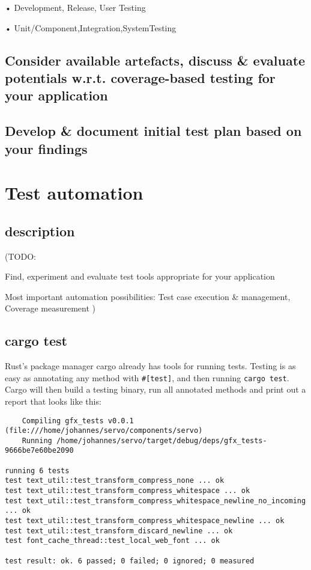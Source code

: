 \documentclass{scrartcl}
\newcommand{\todo}[1] {{\color{red}(TODO: #1)}}
\begin{document}
• Development, Release, User Testing

• Unit/Component,Integration,SystemTesting

\subsection{Consider available artefacts, discuss \& evaluate potentials w.r.t. coverage-based testing for your application}

\subsection{Develop \& document initial test plan based on your findings}





\newpage



\section{Test automation}

\subsection{description}
\todo {

Find, experiment and evaluate test tools appropriate for your application

Most important automation possibilities: Test case execution \& management, Coverage measurement
}

\subsection{cargo test}

Rust's package manager cargo already has tools for running tests. Testing is as easy as annotating any method with \texttt{\#[test]}, and then running \texttt{cargo test}. Cargo will then build a testing binary, run all annotated methods and print out a report that looks like this:


\begin{verbatim}
    Compiling gfx_tests v0.0.1 (file:///home/johannes/servo/components/servo)
    Running /home/johannes/servo/target/debug/deps/gfx_tests-9666be7e60be2090

running 6 tests
test text_util::test_transform_compress_none ... ok
test text_util::test_transform_compress_whitespace ... ok
test text_util::test_transform_compress_whitespace_newline_no_incoming ... ok
test text_util::test_transform_compress_whitespace_newline ... ok
test text_util::test_transform_discard_newline ... ok
test font_cache_thread::test_local_web_font ... ok

test result: ok. 6 passed; 0 failed; 0 ignored; 0 measured

\end{verbatim}
\end{document}
